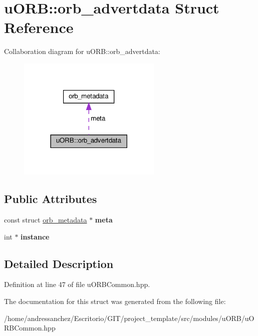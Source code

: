 \hypertarget{structuORB_1_1orb__advertdata}{}\section{u\+O\+RB\+:\+:orb\+\_\+advertdata Struct Reference}
\label{structuORB_1_1orb__advertdata}


Collaboration diagram for u\+O\+RB\+:\+:orb\+\_\+advertdata\+:\nopagebreak
\begin{figure}[H]
\begin{center}
\leavevmode
\includegraphics[width=194pt]{d7/d7a/structuORB_1_1orb__advertdata__coll__graph}
\end{center}
\end{figure}
\subsection*{Public Attributes}
\begin{DoxyCompactItemize}
\item 
\mbox{\label{structuORB_1_1orb__advertdata_ae64bf6fa26c5e4527b10915d99a120ef}} 
const struct \hyperlink{structorb__metadata}{orb\+\_\+metadata} $\ast$ {\bfseries meta}
\item 
\mbox{\label{structuORB_1_1orb__advertdata_a9c25a2ad60208f58430b18b5d3d28e7e}} 
int $\ast$ {\bfseries instance}
\end{DoxyCompactItemize}


\subsection{Detailed Description}


Definition at line 47 of file u\+O\+R\+B\+Common.\+hpp.



The documentation for this struct was generated from the following file\+:\begin{DoxyCompactItemize}
\item 
/home/andressanchez/\+Escritorio/\+G\+I\+T/project\+\_\+template/src/modules/u\+O\+R\+B/u\+O\+R\+B\+Common.\+hpp\end{DoxyCompactItemize}
